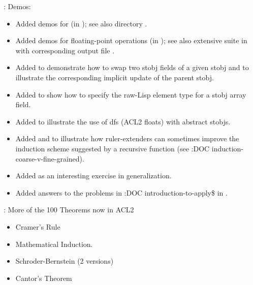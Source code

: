 \begin{frame}

\implibtitle

:
Demos:
\begin{itemize}
\item Added demos for  (in
      );
      see also directory .
\item Added demos for floating-point operations (in );
      see also extensive suite in 
      with corresponding output file .
\item Added  to demonstrate how
      to swap two stobj fields of a given stobj and to illustrate the
      corresponding implicit update of the parent stobj.
\item Added  to show how to specify
      the raw-Lisp  element type for a stobj array field.
\item Added  to illustrate
      the use of dfs (ACL2 floats) with abstract stobjs.
\item Added  and
       to illustrate how
      ruler-extenders can sometimes improve the induction scheme
      suggested by a recursive function (see :DOC
      induction-coarse-v-fine-grained).
\item Added  as an interesting exercise in
      generalization.
\item Added answers to the problems in :DOC introduction-to-apply\$ in
      .
\end{itemize}

\end{frame}


\begin{frame}

\implibtitle

: More of the 100 Theorems now in ACL2
\begin{itemize}
\item Cramer's Rule
\item Mathematical Induction.
\item Schroder-Bernstein (2 versions)
\item Cantor's Theorem
\end{itemize}

\end{frame}

